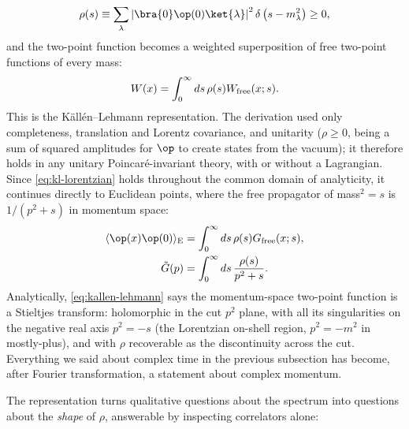 \begin{equation}
\rho(s) \equiv \sum_\lambda \left|\bra{0}\op(0)\ket{\lambda}\right|^2
\delta\left(s - m_\lambda^2\right) \ge 0,
\label{eq:spectral-density}
\end{equation}
and the two-point function becomes a weighted superposition of free
two-point functions of every mass:
\begin{equation}
W(x) = \int_0^\infty ds\, \rho(s) W_{\rm free}(x; s).
\label{eq:kl-lorentzian}
\end{equation}
This is the K\"all\'en--Lehmann representation. The derivation used only
completeness, translation and Lorentz covariance, and unitarity ($\rho \ge
0$, being a sum of squared amplitudes for $\op$ to create states from the
vacuum); it therefore holds in any unitary Poincar\'e-invariant theory, with
or without a Lagrangian. Since \eqref{eq:kl-lorentzian} holds throughout the
common domain of analyticity, it continues directly to Euclidean points,
where the free propagator of mass$^2 = s$ is $1/(p^2 + s)$ in momentum
space:
\begin{equation}
\begin{aligned}
\langle \op(x) \op(0) \rangle_{\rm E}
&= \int_0^\infty ds\, \rho(s) G_{\rm free}(x; s),\\
\tilde G(p) &= \int_0^\infty ds\, \frac{\rho(s)}{p^2 + s}.
\end{aligned}
\label{eq:kallen-lehmann}
\end{equation}
Analytically, \eqref{eq:kallen-lehmann}
says the momentum-space two-point function is a Stieltjes transform: holomorphic
in the cut $p^2$ plane, with all its singularities on the negative real axis
$p^2 = -s$ (the Lorentzian on-shell region, $p^2 = -m^2$ in mostly-plus), and
with $\rho$ recoverable as the discontinuity across the cut. Everything we said
about complex time in the previous subsection has become, after Fourier
transformation, a statement about complex momentum.

The representation turns qualitative questions about the spectrum into
questions about the \emph{shape} of $\rho$, answerable by inspecting
correlators alone:

